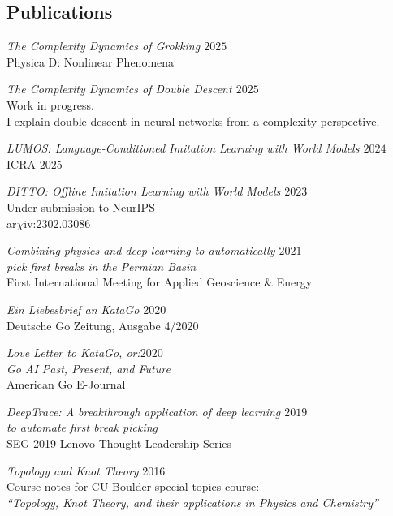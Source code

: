 \documentclass[margin]{res}
\begin{document}
\begin{resume}
                 \section{Publications}

                 {\sl The Complexity Dynamics of Grokking \hfill $2025$}\\
                 Physica D: Nonlinear Phenomena

                 {\sl The Complexity Dynamics of Double Descent \hfill $2025$}\\
                 Work in progress.\\
                 I explain double descent in neural networks from a complexity perspective.

                 {\sl LUMOS: Language-Conditioned Imitation Learning with World Models \hfill $2024$}\\
                 ICRA 2025

                 {\sl DITTO: Offline Imitation Learning with World Models \hfill            $2023$}\\
                 Under submission to NeurIPS\\
                 ar$\chi$iv:2302.03086


                 {\sl Combining physics and deep learning to automatically \hfill            $2021$ \\ pick first breaks in the Permian Basin} \\
		First International Meeting for Applied Geoscience \& Energy

                {\sl Ein Liebesbrief an KataGo} \hfill 2020 \\
                Deutsche Go Zeitung, Ausgabe 4/2020

                {\sl Love Letter to KataGo, or:\hfill $2020$\\ Go AI Past, Present, and Future} \\
                American Go E-Journal

                {\sl DeepTrace: A breakthrough application of deep learning \hfill $2019$\\ to automate first break picking}  \\
                SEG 2019 Lenovo Thought Leadership Series

                {\sl Topology and Knot Theory} \hfill 2016 \\
                Course notes for CU Boulder special topics course: \\
                \textit{``Topology, Knot Theory, and their applications in Physics and Chemistry''}


\end{resume}
\end{document}
